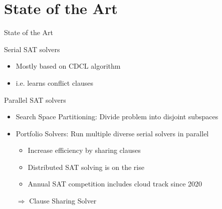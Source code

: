 \documentclass[]{sdqbeamer}
\begin{document}
\section{State of the Art}
\begin{frame}{State of the Art}
    \begin{block}{Serial SAT solvers}
        \begin{itemize}
            \item Mostly based on CDCL algorithm
            \item i.e. learns conflict clauses
        \end{itemize}
    \end{block}

    \begin{block}{Parallel SAT solvers}
        \begin{itemize}
            \item Search Space Partitioning: Divide problem into disjoint subspaces
            \item Portfolio Solvers: Run multiple diverse serial solvers in parallel
            \begin{itemize}
                \item Increase efficiency by sharing clauses
                \item Distributed SAT solving is on the rise
                \item Annual SAT competition includes cloud track since 2020
            \end{itemize}
            \item[$\Rightarrow$] Clause Sharing Solver
        \end{itemize}
    \end{block}
\end{frame}
\end{document}
